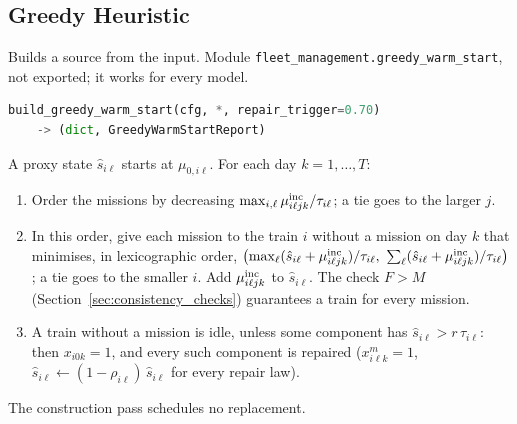 \subsection{Greedy Heuristic}
\label{sec:greedy}

Builds a source from the input. Module \texttt{fleet\_management.greedy\_warm\_start}, not exported; it works for every model.

\begin{lstlisting}[language=Python]
build_greedy_warm_start(cfg, *, repair_trigger=0.70)
    -> (dict, GreedyWarmStartReport)
\end{lstlisting}

\tabend

\tabend

\tabend

A proxy state $\hat s_{i\ell}$ starts at $\mu_{0,i\ell}$. For each day $k = 1,\ldots,T$:
\begin{enumerate}[nosep,label=\arabic*.]
  \item Order the missions by decreasing $\max_{i,\ell} \mu^{\mathrm{inc}}_{i\ell jk}/\tau_{i\ell}$; a tie goes to the larger $j$.
  \item In this order, give each mission to the train $i$ without a mission on day $k$ that minimises, in lexicographic order,
    $\bigl(\max_\ell (\hat s_{i\ell} + \mu^{\mathrm{inc}}_{i\ell jk})/\tau_{i\ell},\ \sum_\ell (\hat s_{i\ell} + \mu^{\mathrm{inc}}_{i\ell jk})/\tau_{i\ell}\bigr)$; a tie goes to the smaller $i$.
    Add $\mu^{\mathrm{inc}}_{i\ell jk}$ to $\hat s_{i\ell}$. The check $F > M$ (Section~\ref{sec:consistency_checks}) guarantees a train for every mission.
  \item A train without a mission is idle, unless some component has $\hat s_{i\ell} > r\,\tau_{i\ell}$: then $x_{i0k} = 1$, and every such component is repaired ($x^m_{i\ell k} = 1$, $\hat s_{i\ell} \leftarrow (1-\rho_{i\ell})\,\hat s_{i\ell}$ for every repair law).
\end{enumerate}
The construction pass schedules no replacement.

